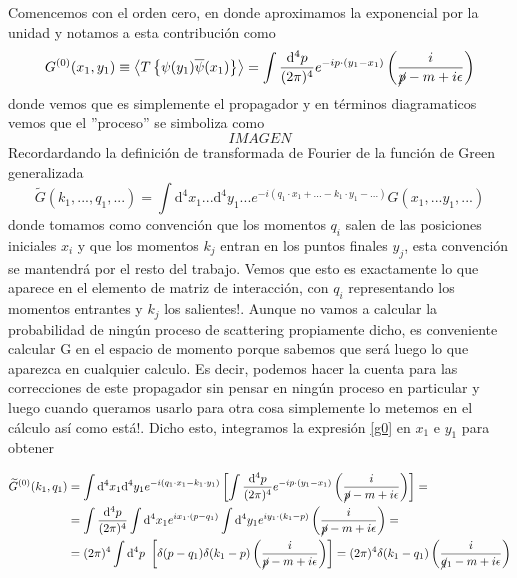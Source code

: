\documentclass{article}
\numberwithin{equation}{section}
\begin{document}
Comencemos con el orden cero, en donde
aproximamos la exponencial por la unidad y notamos a esta contribución
como 
\begin{equation}\label{g0}
G^{(0)}(x_{1},y_{1}) \equiv \left\langle T\left\{ \psi(y_{1})\overline{\psi}(x_{1})\right\} \right\rangle =\int\frac{\mathrm{\mathrm{d^4}}p}{(2\pi)^{4}}e^{-ip\cdot(y_{1}-x_{1})}\left(\frac{i}{\cancel{p}-m+i\epsilon}\right)
\end{equation}
donde vemos que es simplemente el propagador y en términos diagramaticos
vemos que el ''proceso'' se simboliza como
\begin{equation}
IMAGEN
\end{equation}
Recordardando la definición de transformada de Fourier de la función
de Green generalizada
\begin{equation}
\widetilde{G}(k_{1},...,q_{1},...)=\int \mathrm{\mathrm{d^4}}x_{1}...\mathrm{\mathrm{d^4}}y_{1}...e^{-i(q_{1}\cdot x_{1} +... - k_{1}\cdot y_{1}-...)}G(x_{1},...y_{1},...) 
\end{equation}
donde tomamos como convención que los momentos $ q_i $ salen de las posiciones iniciales $ x_i $ y que los momentos $ k_j $ entran en los puntos finales $ y_j $, esta convención se mantendrá por el resto del trabajo. 
Vemos que esto es exactamente lo que aparece en el elemento de matriz
de interacción, con $q_{i}$ representando los momentos entrantes
y $k_{j}$ los salientes!. Aunque no vamos a calcular
la probabilidad de ningún proceso de scattering propiamente dicho, es conveniente calcular G en el
espacio de momento porque sabemos que será luego lo que aparezca en
cualquier calculo. Es decir, podemos hacer la cuenta para las correcciones
de este propagador sin pensar en ningún proceso en particular y luego
cuando queramos usarlo para otra cosa simplemente lo metemos en el
cálculo así como está!. Dicho esto, integramos la expresión \ref{g0} en
$x_{1}$ e $y_{1}$ para obtener

\begin{equation}\label{g0fourier}
\begin{aligned}
\widetilde{G}^{(0)}(k_{1},q_{1})&= \int \mathrm{\mathrm{d^4}}x_{1}\mathrm{\mathrm{d^4}}y_{1} e^{-i(q_1\cdot x_1 - k_1\cdot y_1)}\left[ \int\frac{\mathrm{d^4}p}{(2\pi)^{4}}e^{-ip\cdot(y_{1}-x_{1})}\left(\frac{i}{\cancel{p}-m+i\epsilon}\right) \right] =\\
&=\int\frac{\mathrm{d^4}p}{(2\pi)^{4}} \int \mathrm{d^4}x_{1} e^{ix_1\cdot(p-q_1)} \int \mathrm{d^4}y_{1} e^{iy_1\cdot(k_1-p)} \left(\frac{i}{\cancel{p}-m+i\epsilon}\right) =\\
&=(2\pi)^{4}\int \mathrm{d^4}p \ \left[\delta(p-q_{1})\delta(k_1-p)\left(\frac{i}{\cancel{p}-m+i\epsilon}\right)\right]=(2\pi)^{4}\delta(k_{1}-q_{1})\left(\frac{i}{\cancel{q}_{1}-m+i\epsilon}\right)
\end{aligned}
\end{equation}
\end{document}

